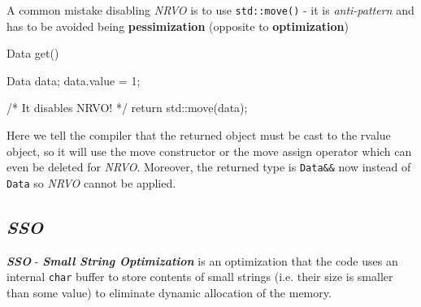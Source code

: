 \documentclass[../main]{subfiles}
\begin{document}
    A common mistake disabling \textit{NRVO} is to use \texttt{std::move()} - it is \textit{anti-pattern} and has to be avoided being \textbf{pessimization}
(opposite to \textbf{optimization})
\begin{Code}
    Data get()
    {
        Data data;
        data.value = 1;
        
        /* It disables NRVO! */
        return std::move(data);
    }
\end{Code}
\noindent
Here we tell the compiler that the returned object must be cast to the rvalue object, so it will use the move constructor or the move assign operator which can even be deleted for \textit{NRVO}.
Moreover, the returned type is \texttt{Data\&\&} now instead of \texttt{Data} so \textit{NRVO} cannot be applied.

\subsection{\textit{SSO}}
    \textbf{\textit{SSO}} - \textbf{\textit{Small String Optimization}} is an optimization that the code uses an internal \texttt{char} buffer to store contents
of small strings (i.e. their size is smaller than some value) to eliminate dynamic allocation of the memory.
\end{document}
